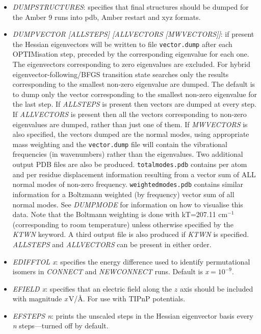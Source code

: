 \documentclass[12pt,a4paper,dvips]{article}
\begin{document}
\begin{itemize}
\item {\it DUMPSTRUCTURES\/}: specifies that final structures should be dumped for the Amber 9 
runs into pdb, Amber restart and xyz formats.

\item {\it DUMPVECTOR [ALLSTEPS] [ALLVECTORS [MWVECTORS]]}: if present the Hessian eigenvectors 
will be written to file {\tt vector.dump} after each OPTIMisation step,
preceded by the corresponding eigenvalue for each one. The
eigenvectors corresponding to zero eigenvalues are excluded. For hybrid eigenvector-following/BFGS
transition state searches only the results corresponding to the smallest non-zero
eigenvalue are dumped. The default is to dump only the vector corresponding
to the smallest non-zero eigenvalue for the last step. If {\it ALLSTEPS\/} is
present then vectors are dumped at every step. If {\it ALLVECTORS\/} is present
then all the vectors corresponding to non-zero eigenvalues are dumped, rather
than just one of them. If {\it MWVECTORS\/} is also specified, the vectors dumped are the normal modes, 
using appropriate mass weighting and the {\tt vector.dump} file will contain the vibrational frequencies (in wavenumbers) rather than the eigenvalues. Two additional output PDB files are also be produced. {\tt totalmodes.pdb} contains per atom and per residue displacement information resulting from a vector sum of ALL normal modes of non-zero frequency. {\tt weightedmodes.pdb} contains similar information for a Boltzmann weighted (by frequency) vector sum of all normal modes. See {\it DUMPMODE} for information on how to visualise this data. Note that the Boltmann weighting is done with kT=207.11 cm$^{-1}$ (corresponding to room temperature) unless otherwise specified by the {\it KTWN} keyword. A third output file is also produced if {\it KTWN} is specified. {\it ALLSTEPS\/} and {\it ALLVECTORS\/} can be present in
either order. 

\item {\it EDIFFTOL x\/}: specifies the energy difference used to identify permutational isomers
in {\it CONNECT\/} and {\it NEWCONNECT\/} runs. Default is {\it x}$=10^{-9}$.

\item {\it EFIELD x\/}: specifies that an electric field along the $z$ axis
should be included with magnitude {\it x}\,V/\AA. For use with TIPnP potentials.

\item {\it EFSTEPS n\/}: prints the unscaled steps in the Hessian
eigenvector basis every {\it n\/} steps---turned off by default.


\end{itemize}
\end{document}
